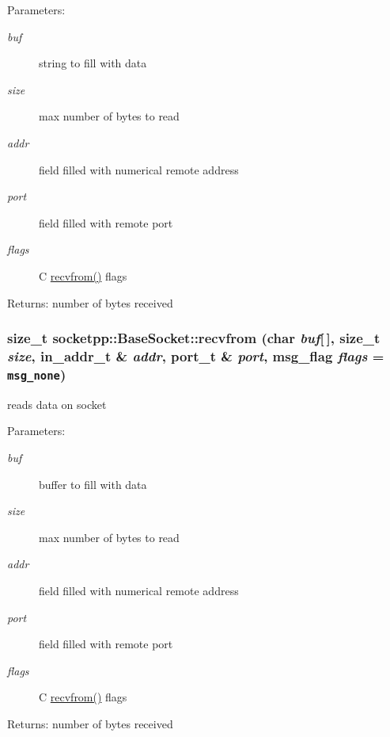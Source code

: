 \begin{CompactItemize}
\begin{Desc}
\item[Parameters:]
\begin{description}
\item[{\em buf}]string to fill with data \item[{\em size}]max number of bytes to read \item[{\em addr}]field filled with numerical remote address \item[{\em port}]field filled with remote port \item[{\em flags}]C \hyperlink{classsocketpp_1_1BaseSocket_6a207860c0a1328dc05bea32bb62e81f}{recvfrom()} flags \end{description}
\end{Desc}
\begin{Desc}
\item[Returns:]number of bytes received \end{Desc}
\hypertarget{classsocketpp_1_1BaseSocket_6a207860c0a1328dc05bea32bb62e81f}{
\subsubsection[{recvfrom}]{\setlength{\rightskip}{0pt plus 5cm}size\_\-t socketpp::BaseSocket::recvfrom (char {\em buf}\mbox{[}$\,$\mbox{]}, \/  size\_\-t {\em size}, \/  in\_\-addr\_\-t \& {\em addr}, \/  port\_\-t \& {\em port}, \/  msg\_\-flag {\em flags} = {\tt msg\_\-none})}}
\label{classsocketpp_1_1BaseSocket_6a207860c0a1328dc05bea32bb62e81f}


reads data on socket 

\begin{Desc}
\item[Parameters:]
\begin{description}
\item[{\em buf}]buffer to fill with data \item[{\em size}]max number of bytes to read \item[{\em addr}]field filled with numerical remote address \item[{\em port}]field filled with remote port \item[{\em flags}]C \hyperlink{classsocketpp_1_1BaseSocket_6a207860c0a1328dc05bea32bb62e81f}{recvfrom()} flags \end{description}
\end{Desc}
\begin{Desc}
\item[Returns:]number of bytes received \end{Desc}
\hypertarget{classsocketpp_1_1BaseSocket_483c6186ae60d0c399983e14f55af600}{
}
\end{CompactItemize}
